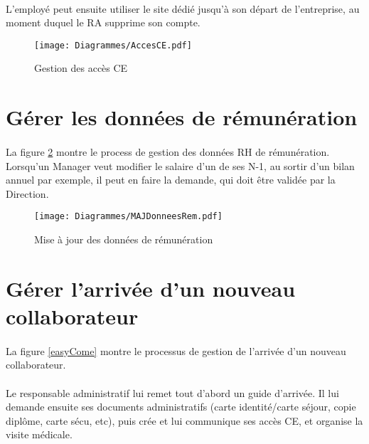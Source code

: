 \paragraph{} L'employé peut ensuite utiliser le site dédié jusqu'à son départ de l'entreprise, au moment duquel le RA supprime son compte.


\begin{figure}
	\texttt{[image: Diagrammes/AccesCE.pdf]}
	\caption{Gestion des accès CE}
	\label{accesCE}	
\end{figure}

\section{Gérer les données de rémunération}

\paragraph{}La figure \ref{MAJDonneesRH} montre le process de gestion des données RH de rémunération. Lorsqu'un Manager veut modifier le salaire d'un de ses N-1, au sortir d'un bilan annuel par exemple, il peut en faire la demande, qui doit être validée par la Direction.



\begin{figure}
	\centering
	\texttt{[image: Diagrammes/MAJDonneesRem.pdf]}
	\caption{Mise à jour des données de rémunération}
	\label{MAJDonneesRH}
\end{figure}




\section{Gérer l'arrivée d'un nouveau collaborateur}

\paragraph{} La figure \ref{easyCome} montre le processus de gestion de l'arrivée d'un nouveau collaborateur.
\paragraph{} Le responsable administratif lui remet tout d'abord un guide d'arrivée. Il lui demande ensuite ses documents administratifs (carte identité/carte séjour, copie diplôme, carte sécu, etc), puis crée et lui communique ses accès CE, et organise la visite médicale.
